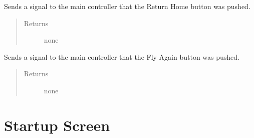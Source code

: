\documentclass[letterpaper,10pt,english]{sphinxmanual}
\begin{document}
\begin{fulllineitems}
\begin{fulllineitems}
\begin{quote}
\begin{description}
\end{description}\end{quote}

\end{fulllineitems}


\begin{fulllineitems}
\label{\detokenize{index:src.Views.View_ReportScreen.ReportWindow.signalReturnHome}}
Sends a signal to the main controller that the Return Home button was pushed.
\begin{quote}\begin{description}
\item[{Returns}] \leavevmode
none

\end{description}\end{quote}

\end{fulllineitems}


\begin{fulllineitems}
\label{\detokenize{index:src.Views.View_ReportScreen.ReportWindow.signalStartTracking}}
Sends a signal to the main controller that the Fly Again button was pushed.
\begin{quote}\begin{description}
\item[{Returns}] \leavevmode
none

\end{description}\end{quote}

\end{fulllineitems}


\end{fulllineitems}



\chapter{Startup Screen}
\label{\detokenize{index:module-src.Views.View_StartupScreen}}\label{\detokenize{index:startup-screen}}
\end{document}
